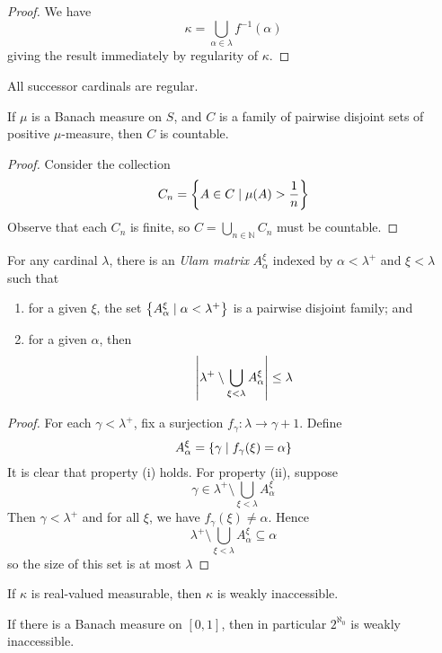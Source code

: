 \begin{proof}
    We have
    \[ \kappa = \bigcup_{\alpha \in \lambda} f^{-1}(\alpha) \]
    giving the result immediately by regularity of \( \kappa \).
\end{proof}
\begin{proposition}
    All successor cardinals are regular.
\end{proposition}
\begin{proposition}
    If \( \mu \) is a Banach measure on \( S \), and \( C \) is a family of pairwise disjoint sets of positive \( \mu \)-measure, then \( C \) is countable.
\end{proposition}
\begin{proof}
    Consider the collection
    \[ C_n = \qty{A \in C \mid \mu(A) > \frac{1}{n}} \]
    Observe that each \( C_n \) is finite, so \( C = \bigcup_{n \in \mathbb N} C_n \) must be countable.
\end{proof}
\begin{lemma}[Ulam]
    For any cardinal \( \lambda \), there is an \emph{Ulam matrix} \( A_\alpha^\xi \) indexed by \( \alpha < \lambda^+ \) and \( \xi < \lambda \) such that
    \begin{enumerate}
        \item for a given \( \xi \), the set \( \qty{A_\alpha^\xi \mid \alpha < \lambda^+} \) is a pairwise disjoint family; and
        \item for a given \( \alpha \), then
        \[ \abs{\lambda^+ \setminus \bigcup_{\xi < \lambda} A_\alpha^\xi} \leq \lambda \]
    \end{enumerate}
\end{lemma}
\begin{proof}
    For each \( \gamma < \lambda^+ \), fix a surjection \( f_\gamma : \lambda \to \gamma + 1 \).
    Define
    \[ A_\alpha^\xi = \qty{\gamma \mid f_\gamma(\xi) = \alpha} \]
    It is clear that property (i) holds.
    For property (ii), suppose
    \[ \gamma \in \lambda^+ \setminus \bigcup_{\xi < \lambda} A_\alpha^\xi \]
    Then \( \gamma < \lambda^+ \) and for all \( \xi \), we have \( f_\gamma(\xi) \neq \alpha \).
    Hence
    \[ \lambda^+ \setminus \bigcup_{\xi < \lambda} A_\alpha^\xi \subseteq \alpha \]
    so the size of this set is at most \( \lambda \)
\end{proof}
\begin{theorem}
    If \( \kappa \) is real-valued measurable, then \( \kappa \) is weakly inaccessible.
\end{theorem}
\begin{remark}
    If there is a Banach measure on \( [0,1] \), then in particular \( 2^{\aleph_0} \) is weakly inaccessible.
\end{remark}
